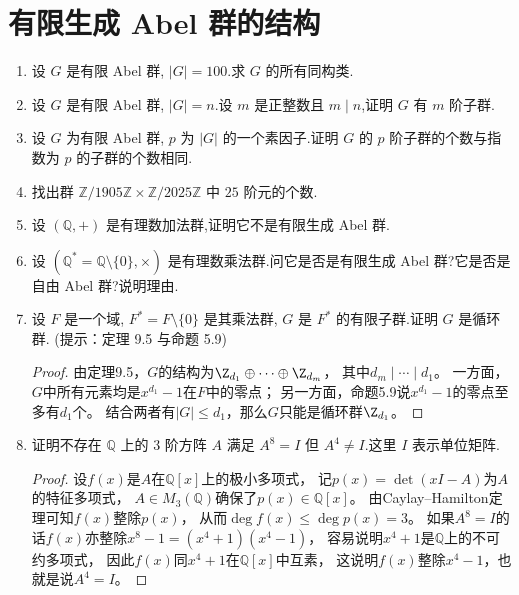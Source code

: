 \section{有限生成 Abel 群的结构}

\begin{enumerate}

\item 设 $ G $ 是有限 Abel 群, $ |G| = 100 $.求 $ G $ 的所有同构类.

\item 设 $ G $ 是有限 Abel 群, $ |G| = n $.设 $ m $ 是正整数且 $ m \mid n $,证明 $ G $ 有 $ m $ 阶子群.

\item 设 $ G $ 为有限 Abel 群, $ p $ 为 $ |G| $ 的一个素因子.证明 $ G $ 的 $ p $ 阶子群的个数与指数为 $ p $ 的子群的个数相同.

\item 找出群 $ \mathbb{Z}/1905\mathbb{Z} \times \mathbb{Z}/2025\mathbb{Z} $ 中 $25$ 阶元的个数.

\item 设 $ (\mathbb{Q}, +) $ 是有理数加法群,证明它不是有限生成 Abel 群.

\item 设 $ (\mathbb{Q}^* = \mathbb{Q} \setminus \{0\}, \times) $ 是有理数乘法群.问它是否是有限生成 Abel 群?它是否是自由 Abel 群?说明理由.

\item 设 $ F $ 是一个域, $ F^* = F \setminus \{0\} $ 是其乘法群, $ G $ 是 $ F^* $ 的有限子群.证明 $ G $ 是循环群. (提示：定理 9.5 与命题 5.9)
\begin{proof}
    由定理9.5，$G$的结构为$\Z_{d_1}\oplus\cdots\oplus\Z_{d_m}$，
    其中$d_m \mid\cdots\mid d_1$。
    一方面，$G$中所有元素均是$x^{d_1}-1$在$F$中的零点；
    另一方面，命题5.9说$x^{d_1}-1$的零点至多有$d_1$个。
    结合两者有$|G| \leqslant d_1$，那么$G$只能是循环群$\Z_{d_1}$。
\end{proof}
\item 证明不存在 $ \mathbb{Q} $ 上的 $3$ 阶方阵 $ A $ 满足 $ A^8 = I $ 但 $ A^4 \neq I $.这里 $ I $ 表示单位矩阵.
\begin{proof}
    设$f(x)$是$A$在$\mathbb{Q}[x]$上的极小多项式，
    记$p(x)=\det(xI-A)$为$A$的特征多项式，
    $A \in M_3(\mathbb{Q})$确保了$p(x)\in\mathbb{Q}[x]$。
    由Caylay--Hamilton定理可知$f(x)$整除$p(x)$，
    从而$\deg f(x)\leqslant\deg p(x)=3$。
    如果$A^8=I$的话$f(x)$亦整除$x^8-1=(x^4+1)(x^4-1)$，
    容易说明$x^4+1$是$\mathbb{Q}$上的不可约多项式，
    因此$f(x)$同$x^4+1$在$\mathbb{Q}[x]$中互素，
    这说明$f(x)$整除$x^4-1$，也就是说$A^4=I$。
\end{proof}
\end{enumerate}

